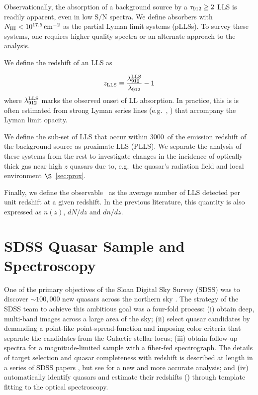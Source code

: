 \documentclass[12pt,preprint]{aastex}
\begin{document}
Observationally, the absorption of a background source
by a $\tau_{\rm 912} \ge 2$ LLS is 
readily apparent, even in low S/N spectra.
We define absorbers with $N_{\rm HI} < 10^{17.5} \, {\rm cm^{-2}}$ as the 
partial Lyman limit systems (pLLSs).  To survey these systems,
one requires higher quality spectra or an alternate approach to the analysis.

We define the redshift of an LLS as

\begin{equation}
z_{\rm LLS} \equiv \frac{\lambda_{\rm 912}^{\rm LLS}}{\lambda_{\rm 912}} - 1
\end{equation}
where $\lambda_{\rm 912}^{\rm LLS}$ marks the observed onset of LL absorption.
In practice, this is is often estimated from strong Lyman series lines
(e.g.\ \lya, \lyb) that accompany the Lyman limit opacity.

We define the sub-set of LLS that occur within 3000\kms\
of the emission redshift of the background source as proximate LLS
(PLLS).  We separate the analysis of these systems from the rest
to investigate changes in the incidence of optically thick gas
near high $z$ quasars due to, e.g.\ the quasar's radiation field
and local environment $\S$~\ref{sec:prox}.

Finally, we define the observable \lzlls\ as the average
number of LLS detected per unit redshift at a given redshift.
In the previous literature, this quantity is also expressed
as $n(z)$, $dN/dz$ and $dn/dz$.

\section{SDSS Quasar Sample and Spectroscopy}

One of the primary objectives of the Sloan Digital Sky Survey (SDSS)
was to discover $\sim 100,000$ new quasars across the northern sky
\citep{yaa+00}.  The strategy of the SDSS team to achieve this
ambitious goal was a four-fold process:
(i) obtain deep, multi-band images across a large area of the sky;
(ii) select quasar candidates by demanding a point-like point-spread-function
and imposing color criteria that separate the candidates from the
Galactic stellar locus;
(iii) obtain follow-up spectra for a magnitude-limited sample
with a fiber-fed spectrograph.
The details of target selection and quasar completeness with
redshift is described at length in a series of SDSS papers
\citep{rfn+02}, but see \citep{wp09} for a new and more accurate analysis;  
and
(iv) automatically identify quasars and estimate their redshifts
(\zem) through template fitting to the optical spectroscopy.
\end{document}
